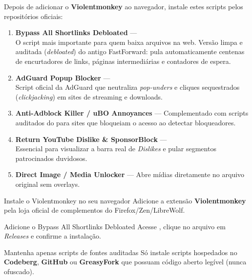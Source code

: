\documentclass{pousadaguide}
\begin{document}
Depois de adicionar o \textbf{Violentmonkey} ao navegador, instale estes scripts pelos repositórios oficiais:

\begin{enumerate}
  \item \textbf{Bypass All Shortlinks Debloated} \goat — \\
  O script mais importante para quem baixa arquivos na web. Versão limpa e auditada (\emph{debloated}) do antigo FastForward: pula automaticamente centenas de encurtadores de links, páginas intermediárias e contadores de espera.
  \item \textbf{AdGuard Popup Blocker} — \\
  Script oficial da AdGuard que neutraliza \emph{pop-unders} e cliques sequestrados (\emph{clickjacking}) em sites de streaming e downloads.
  \item \textbf{Anti-Adblock Killer / uBO Annoyances} — Complementado com scripts auditados do  para sites que bloqueiam o acesso ao detectar bloqueadores.
  \item \textbf{Return YouTube Dislike \& SponsorBlock} — \\
  Essencial para visualizar a barra real de \emph{Dislikes} e pular segmentos patrocinados duvidosos.
  \item \textbf{Direct Image / Media Unlocker} — Abre mídias diretamente no arquivo original sem overlays.
\end{enumerate}

\begin{passo}{Instale o Violentmonkey no seu navegador}
Adicione a extensão \textbf{Violentmonkey} pela loja oficial de complementos do Firefox/Zen/LibreWolf.
\end{passo}

\begin{passo}{Adicione o Bypass All Shortlinks Debloated}
Acesse , clique no arquivo  em \emph{Releases} e confirme a instalação.
\end{passo}

\begin{passo}{Mantenha apenas scripts de fontes auditadas}
Só instale scripts hospedados no \textbf{Codeberg}, \textbf{GitHub} ou \textbf{GreasyFork} que possuam código aberto legível (nunca ofuscado).
\end{passo}
\end{document}
